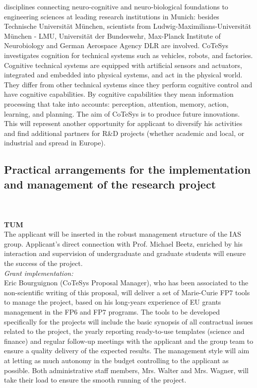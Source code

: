 disciplines    connecting    neuro-cognitive   and    neuro-biological
foundations to  engineering sciences at  leading research institutions
in  Munich: besides  Technische Universit\"at  M\"unchen,  scientists from
Ludwig-Maximilians-Universit\"at   M\"unchen   -   LMU,  Universit\"at   der
Bundeswehr, Max-Planck Institute  of Neurobiology and German Aerospace
Agency  DLR are involved. CoTeSys
investigates cognition for technical systems such as vehicles, robots,
and   factories.  Cognitive  technical   systems  are   equipped  with
artificial  sensors  and   actuators,  integrated  and  embedded  into
physical  systems, and  act in  the physical  world. They  differ from
other technical systems since  they perform cognitive control and have
cognitive   capabilities.   By   cognitive  capabilities   they   mean
information processing that take into accounts: perception, attention,
memory,  action, learning,  and planning.  The  aim of  CoTeSys is  to
produce future  innovations.  This will  represent another opportunity
for applicant to diversify his activities and find additional partners for R\&D
projects  (whether academic  and local,  or industrial  and  spread in
Europe).
\subsection{Practical arrangements for the implementation and 
management of the research project } 
\\
\\
\textbf{TUM}\\
The applicant will be inserted in the robust management structure of the IAS group. 
Applicant's direct connection with Prof. Michael Beetz, enriched by his interaction 
and supervision of undergraduate and graduate students  will ensure the success of the project. \\
\emph{Grant implementation:}\\
Eric Bourguignon  (CoTeSys Proposal Manager), who  has been associated
to the  non-scientific writing of  this proposal, will deliver  a
set of Marie-Curie FP7  tools to manage the  project, based on
his long-years experience  of EU grants management in  the FP6 and FP7
programs. The tools to be developed specifically for the projects will
include the  basic synopsis of  all contractual issues related  to the
project,  the  yearly reporting  ready-to-use  templates (science  and
finance) and regular follow-up meetings  with the applicant and the group 
team to ensure  a quality  delivery of  the expected  results.  The management
style will aim  at letting as much autonomy  in the budget controlling
to the applicant as possible. Both  administrative staff members, Mrs. Walter and
Mrs. Wagner, will take their load  to ensure the smooth running of the
project.

